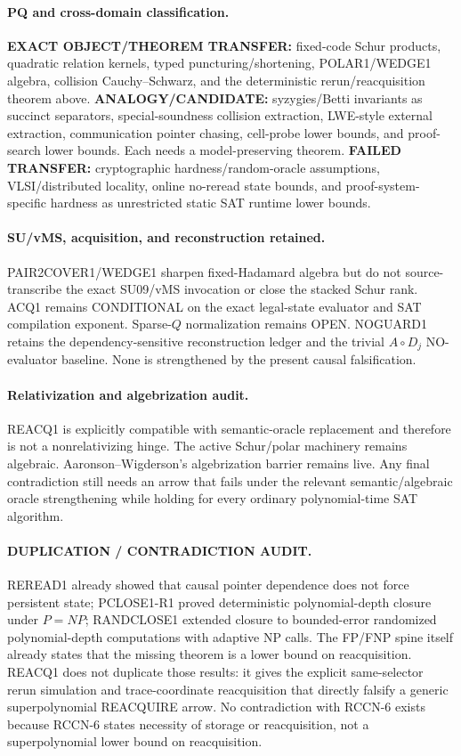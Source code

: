 \documentclass[11pt]{article}
\begin{document}
\paragraph{PQ and cross-domain classification.}
\textbf{EXACT OBJECT/THEOREM TRANSFER:} fixed-code Schur products, quadratic relation kernels, typed puncturing/shortening, POLAR1/WEDGE1 algebra, collision Cauchy--Schwarz, and the deterministic rerun/reacquisition theorem above.
\textbf{ANALOGY/CANDIDATE:} syzygies/Betti invariants as succinct separators, special-soundness collision extraction, LWE-style external extraction, communication pointer chasing, cell-probe lower bounds, and proof-search lower bounds. Each needs a model-preserving theorem.
\textbf{FAILED TRANSFER:} cryptographic hardness/random-oracle assumptions, VLSI/distributed locality, online no-reread state bounds, and proof-system-specific hardness as unrestricted static SAT runtime lower bounds.

\paragraph{SU/vMS, acquisition, and reconstruction retained.}
PAIR2COVER1/WEDGE1 sharpen fixed-Hadamard algebra but do not source-transcribe the exact SU09/vMS invocation or close the stacked Schur rank. ACQ1 remains CONDITIONAL on the exact legal-state evaluator and SAT compilation exponent. Sparse-$Q$ normalization remains OPEN. NOGUARD1 retains the dependency-sensitive reconstruction ledger and the trivial $A\circ D_j$ NO-evaluator baseline. None is strengthened by the present causal falsification.

\paragraph{Relativization and algebrization audit.}
REACQ1 is explicitly compatible with semantic-oracle replacement and therefore is not a nonrelativizing hinge. The active Schur/polar machinery remains algebraic. Aaronson--Wigderson's algebrization barrier remains live. Any final contradiction still needs an arrow that fails under the relevant semantic/algebraic oracle strengthening while holding for every ordinary polynomial-time SAT algorithm.

\paragraph{DUPLICATION / CONTRADICTION AUDIT.}
REREAD1 already showed that causal pointer dependence does not force persistent state; PCLOSE1-R1 proved deterministic polynomial-depth closure under $P=NP$; RANDCLOSE1 extended closure to bounded-error randomized polynomial-depth computations with adaptive NP calls. The FP/FNP spine itself already states that the missing theorem is a lower bound on reacquisition. REACQ1 does not duplicate those results: it gives the explicit same-selector rerun simulation and trace-coordinate reacquisition that directly falsify a generic superpolynomial REACQUIRE arrow. No contradiction with RCCN-6 exists because RCCN-6 states necessity of storage or reacquisition, not a superpolynomial lower bound on reacquisition.
\end{document}
